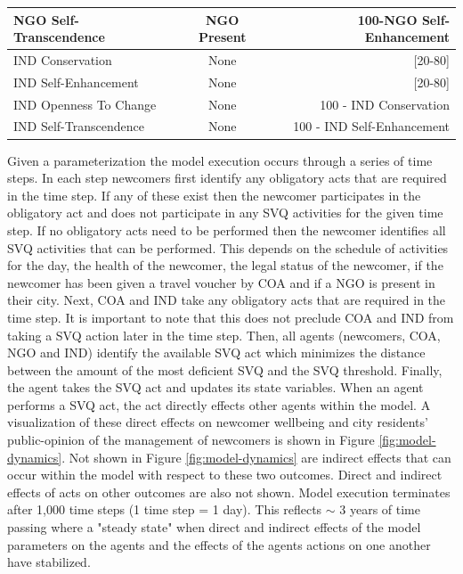 \documentclass{scspaperproc}
\theoremstyle{scsthe}
\begin{document}
\begin{table}[ht]
\begin{center}
{\begin{tabular}{|lcr|}
\hline
NGO Self-Transcendence                                                                                      & NGO Present           &  100-NGO Self-Enhancement   \\
\hline
IND Conservation                                                                                            & None                  & {[}20-80{]}                \\
\hline
IND Self-Enhancement                                                                                        & None                  & {[}20-80{]}                \\
\hline
IND Openness To Change                                                                                      & None                  &  100 - IND Conservation     \\
\hline
IND Self-Transcendence                                                                                      & None                  &  100 - IND Self-Enhancement \\
\hline
\end{tabular}}
\end{center}
\end{table}
Given a parameterization the model execution occurs through a series of time steps. In each step newcomers first identify any obligatory acts that are required in the time step. If any of these exist then the newcomer participates in the obligatory act and does not participate in any SVQ activities for the given time step. If no obligatory acts need to be performed then the newcomer identifies all SVQ activities that can be performed. This depends on the schedule of activities for the day, the health of the newcomer, the legal status of the newcomer, if the newcomer has been given a travel voucher by COA and if a NGO is present in their city. Next, COA and IND take any obligatory acts that are required in the time step. It is important to note that this does not preclude COA and IND from taking a SVQ action later in the time step. Then, all agents (newcomers, COA, NGO and IND) identify the available SVQ act which minimizes the distance between the amount of the most deficient SVQ and the SVQ threshold. Finally, the agent takes the SVQ act and updates its state variables. When an agent performs a SVQ act, the act directly effects other agents within the model. A visualization of these direct effects on newcomer wellbeing and city residents' public-opinion of the management of newcomers is shown in Figure \ref{fig:model-dynamics}. Not shown in Figure \ref{fig:model-dynamics} are indirect effects that can occur within the model with respect to these two outcomes. Direct and indirect effects of acts on other outcomes are also not shown. Model execution terminates after 1,000 time steps (1 time step = 1 day). This reflects $\sim$ 3 years of time passing where a "steady state" when direct and indirect effects of the model parameters on the agents and the effects of the agents actions on one another have stabilized.
\end{document}
